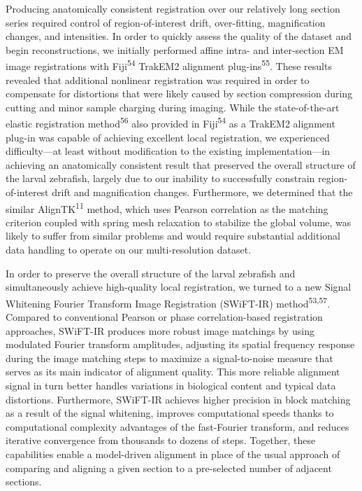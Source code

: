 \documentclass{article}
\begin{document}
Producing anatomically consistent registration over our relatively long section series required control of region-of-interest drift, over-fitting, magnification changes, and intensities. In order to quickly assess the quality of the dataset and begin reconstructions, we initially performed affine intra- and inter-section EM image registrations with Fiji\textsuperscript{54} TrakEM2 alignment plug-ins\textsuperscript{55}. These results revealed that additional nonlinear registration was required in order to
compensate for distortions that were likely caused by section compression during cutting and minor sample charging during imaging. While the state-of-the-art elastic registration method\textsuperscript{56} also provided in Fiji\textsuperscript{54} as a TrakEM2 alignment plug-in was capable of achieving excellent local registration, we experienced difficulty—at least without modification to the existing implementation—in achieving an anatomically consistent result that preserved the overall structure of the larval zebrafish, largely due to our inability to successfully constrain region-of-interest drift and magnification changes. Furthermore, we determined that the similar AlignTK\textsuperscript{11} method, which uses Pearson correlation as the matching criterion coupled with spring mesh relaxation to stabilize the global volume, was likely to suffer from similar problems and would require substantial additional data handling to operate on our multi-resolution dataset.

In order to preserve the overall structure of the larval zebrafish and simultaneously achieve high-quality local registration, we turned to a new Signal Whitening Fourier Transform Image Registration (SWiFT-IR) method\textsuperscript{53,57}. Compared to conventional Pearson or phase correlation-based registration approaches, SWiFT-IR produces more robust image matchings by using modulated Fourier transform amplitudes, adjusting its spatial frequency response during the image matching steps to maximize a signal-to-noise measure that serves as its main indicator of alignment quality. This more reliable alignment signal in turn better handles variations in biological content and typical data distortions. Furthermore, SWiFT-IR achieves higher precision in block matching as a result of the signal whitening, improves computational speeds thanks to computational complexity advantages of the fast-Fourier transform, and reduces iterative convergence from thousands to dozens of steps. Together, these capabilities enable a model-driven alignment in place of the usual approach of comparing and aligning a given section to a pre-selected number of adjacent sections.
\end{document}
